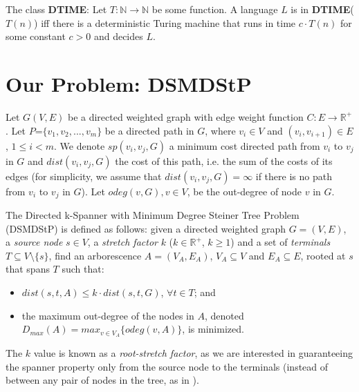 \begin{Def}
\cite{Arora2009} The class \textbf{DTIME}: Let $T : \mathbb{N} \rightarrow \mathbb{N}$ be some function. A language $L$ is in \textbf{DTIME}($T(n)$) iff there is 
a deterministic Turing machine that runs in time $c \cdot T(n)$ for some constant $c > 0$ and decides $L$.
\end{Def}

\section{Our Problem: DSMDStP}
Let $G(V,E)$ be a directed weighted graph with edge weight function $C: E \rightarrow \mathbb{R}^+$. 
Let $P$=$\{v_1, v_2, ..., v_m\}$ be a directed path in $G$, where $v_i \in V$ and %
$(v_i, v_{i+1}) \in E$, \mbox{$1 \le i < m$}. 
We denote $sp(v_i, v_j, G)$ a minimum cost directed path from $v_i$ to $v_j$ in $G$ and $dist(v_i, v_j, G)$ the cost of this path,
i.e. the sum of the costs of its edges (for simplicity, we assume that $dist(v_i, v_j, G)=\infty$ if there is no path from $v_i$ to $v_j$ in $G$).
Let $odeg(v, G), v \in V$, be the out-degree of node $v$ in $G$.

The Directed k-Spanner with Minimum Degree Steiner Tree Problem (\mbox{DSMDStP}) is defined as follows: 
given a directed weighted graph $G=(V, E)$, a \emph{source node} $s \in V$, 
a \emph{stretch factor} $k$ ($k \in \mathbb{R}^+$, $k \ge 1$) and a set of \emph{terminals} $T \subseteq V \setminus \lbrace s \rbrace$, 
find an arborescence $A=(V_A, E_A)$, $V_A \subseteq V$ and $E_A \subseteq E$, rooted at $s$ that spans $T$ such that:

\begin{itemize}
\item $dist(s,t,A) \le k \cdot dist(s,t,G)$, $\forall t \in T$; and
\item the maximum out-degree of the nodes in $A$, denoted $D_{max}(A)=max_{v \in V_A}\{odeg(v, A)\}$, is minimized.
\end{itemize}

The $k$ value is known as a \emph{root-stretch factor}, as we are interested in guaranteeing
the spanner property only from the source node to the terminals (instead of between any pair of nodes in the tree,
as in \cite{Fomin2011}). 

